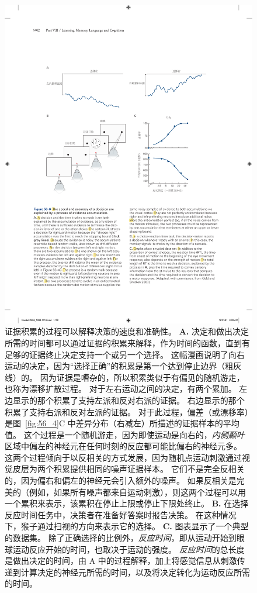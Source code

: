 \begin{figure}[htbp]
	\centering
	\includegraphics[width=0.95\linewidth]{chap56/fig_56_6}
	\caption{证据积累的过程可以解释决策的速度和准确性。
		\textbf{A.} 决定和做出决定所需的时间都可以通过证据的积累来解释，作为时间的函数，直到有足够的证据终止决定支持一个或另一个选择。
		这幅漫画说明了向右运动的决定，因为“选择正确”的积累是第一个达到停止边界（粗灰线）的。
		因为证据是嘈杂的，所以积累类似于有偏见的随机游走，也称为漂移扩散过程。
		对于左右运动之间的决定，有两个累加。
		左边显示的那个积累了支持左派和反对右派的证据。
		右边显示的那个积累了支持右派和反对左派的证据。
		对于此过程，偏差（或漂移率）是图~\ref{fig:56_4}C 中差异分布（右减左）所描述的证据样本的平均值。
		这个过程是一个随机游走，因为即使运动是向右的，\textit{内侧颞叶}区域中偏左的神经元在任何时刻的反应都可能比偏右的神经元多。
		这两个过程倾向于以反相关的方式发展，因为随机点运动刺激通过视觉皮层为两个积累提供相同的噪声证据样本。
		它们不是完全反相关的，因为偏右和偏左的神经元会引入额外的噪声。
		如果反相关是完美的（例如，如果所有噪声都来自运动刺激），则这两个过程可以用一个累积来表示，该累积在停止上限或停止下限处终止。
		\textbf{B.} 在选择反应时间任务中，决策者在准备好答案时报告决策。
		在这种情况下，猴子通过扫视的方向来表示它的选择。
		\textbf{C.} 图表显示了一个典型的数据集。
		除了正确选择的比例外，\textit{反应时间}，即从运动开始到眼球运动反应开始的时间，也取决于运动的强度。
		\textit{反应时间}的总长度是做出决定的时间，由 A 中的过程解释，加上将感觉信息从刺激传递到计算决定的神经元所需的时间，以及将决定转化为运动反应所需的时间\cite{gold2007neural}。 }
	\label{fig:56_6}
\end{figure}


